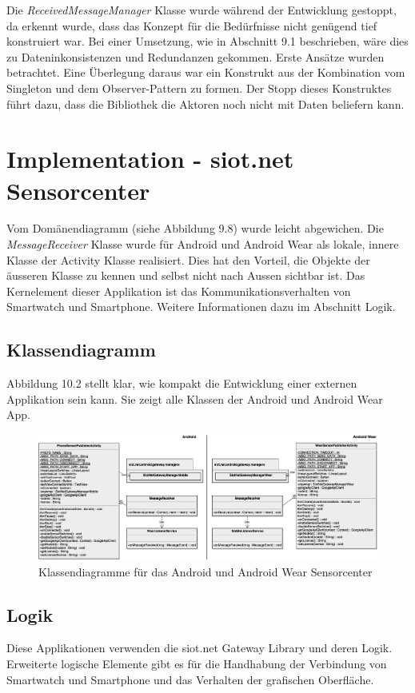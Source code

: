 Die \textit{ReceivedMessageManager} Klasse wurde während der Entwicklung gestoppt, da erkennt wurde, dass das Konzept für die Bedürfnisse nicht genügend tief konstruiert war. Bei einer Umsetzung, wie in Abschnitt 9.1 beschrieben, wäre dies zu Dateninkonsistenzen und Redundanzen gekommen. Erste Ansätze wurden betrachtet. Eine Überlegung daraus war ein Konstrukt aus der Kombination vom Singleton und dem Observer-Pattern zu formen. Der Stopp dieses Konstruktes führt dazu, dass die Bibliothek die Aktoren noch nicht mit Daten beliefern kann.
\section{Implementation - siot.net Sensorcenter}
Vom Domänendiagramm (siehe Abbildung 9.8) wurde leicht abgewichen. Die \textit{MessageReceiver} Klasse wurde für Android und Android Wear als lokale, innere Klasse der Activity Klasse realisiert. Dies hat den Vorteil, die Objekte der äusseren Klasse zu kennen und selbst nicht nach Aussen sichtbar ist. Das Kernelement dieser Applikation ist das Kommunikationsverhalten von Smartwatch und Smartphone. Weitere Informationen dazu im Abschnitt Logik.
\newpage
\subsection{Klassendiagramm}
Abbildung 10.2 stellt klar, wie kompakt die Entwicklung einer externen Applikation sein kann. Sie zeigt alle Klassen der Android und Android Wear App.
\begin{figure}[H]
  \centering
  \includegraphics[scale=0.18]{98_Bilder/10_Implementation/KlassendiagrammSiotNetSensorcenter}
  \caption[siot.net Sensorcenter Klassendiagramm]{Klassendiagramme für das Android und Android Wear Sensorcenter}
\end{figure}
\subsection{Logik}
Diese Applikationen verwenden die siot.net Gateway Library und deren Logik. Erweiterte logische Elemente gibt es für die Handhabung der Verbindung von Smartwatch und Smartphone und das Verhalten der grafischen Oberfläche.

